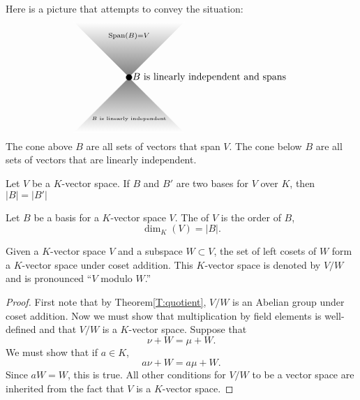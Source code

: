 \documentclass{ximera}
\begin{document}
Here is a picture that attempts to convey the situation:
\[
\begin{tikzpicture}
  \draw[white,thin,shading = axis, top color = white, bottom color = gray] (-2,2) -- (0,0)-- (2,2) -- (-2,2) -- cycle;
  \draw[white,thin,shading = axis, bottom color = white, top color = gray] (-2,-2) -- (0,0)-- (2,-2) -- (-2,-2) -- cycle;
  \filldraw (0,0) circle (3pt);
  \node[right] at (0,0) {$B$ is linearly independent and spans};
  \node at (0,1.5) {$\scriptstyle \Span(B) = V$};
  \node at (0,-1.5) {\tiny $B$  is linearly independent};
\end{tikzpicture}
\]
The cone above $B$ are all sets of vectors that span $V$. The cone
below $B$ are all sets of vectors that are linearly independent.



\begin{corollary}
  Let $V$ be a $K$-vector space. If $B$ and $B'$ are two bases for $V$
  over $K$, then $|B| = |B'|$
\end{corollary}


\begin{definition}
  Let $B$ be a basis for a $K$-vector space $V$. The  of $V$ is the order of $B$,
  \[
  \dim_K(V) = |B|.
  \]
\end{definition}


\begin{example}
\end{example}


\begin{example}
\end{example}



\begin{example}
\end{example}




\begin{theorem}
  Given a $K$-vector space $V$ and a subspace $W\subset V$, the set of
  left cosets of $W$ form a $K$-vector space under coset
  addition. This $K$-vector space is denoted by $V/W$ and is
  pronounced ``$V$ modulo $W$.''
  \begin{proof}
    First note that by Theorem\ref{T:quotient}, $V/W$ is an Abelian
    group under coset addition. Now we must show that multiplication
    by field elements is well-defined and that
    $V/W$ is a $K$-vector space. Suppose that
    \[
    \nu + W = \mu + W.
    \]
    We must show that if $a\in K$,
    \[
    a\nu + W = a\mu + W.
    \]
    Since $aW = W$, this is true. All other conditions for $V/W$ to be
    a vector space are inherited from the fact that $V$ is a $K$-vector
    space.
  \end{proof}
\end{theorem}
\end{document}
